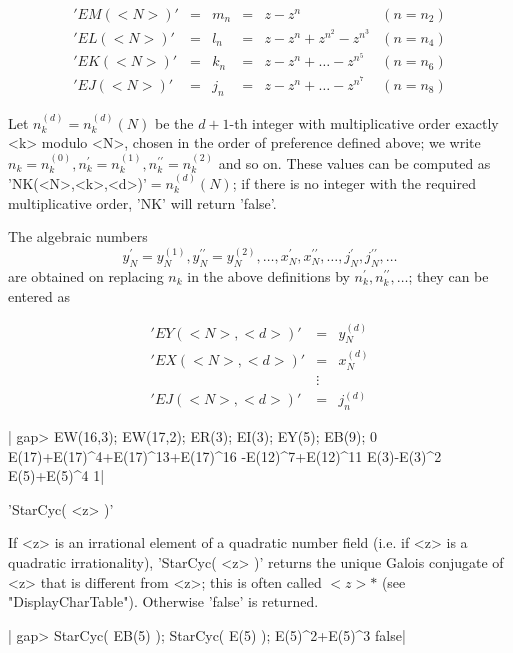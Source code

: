 \[\begin{array}{llllll}
'EM(<N>)' & = & m_n & = & z-z^n &(n=n_2)\\
'EL(<N>)' & = & l_n & = & z-z^n+z^{n^2}-z^{n^3} &(n=n_4)\\
'EK(<N>)' & = & k_n & = & z-z^n+\ldots -z^{n^5} &(n=n_6)\\
'EJ(<N>)' & = & j_n & = & z-z^n+\ldots -z^{n^7} &(n=n_8)
\end{array}\]

Let  $n_k^{(d)}  =  n_k^{(d)}(N)$  be   the   $d+1$-th  integer   with
multiplicative order exactly <k> modulo  <N>,  chosen  in the order of
preference          defined          above;          we          write
$n_k=n_k^{(0)},n_k^{\prime}=n_k^{(1)}, n_k^{\prime\prime} = n_k^{(2)}$
and  so  on.  These  values can be  computed  as 'NK(<N>,<k>,<d>)'$  =
n_k^{(d)}(N)$; if there is no integer with the required multiplicative
order, 'NK' will return 'false'.

The algebraic numbers
\[y_N^{\prime}=y_N^{(1)},y_N^{\prime\prime}=y_N^{(2)},\ldots,
x_N^{\prime},x_N^{\prime\prime},\ldots,
j_N^{\prime},j_N^{\prime\prime},\ldots\]
are obtained on replacing $n_k$ in the above
definitions by $n_k^{\prime},n_k^{\prime\prime},\ldots$; they
can be entered as

\[\begin{array}{lll}
'EY(<N>,<d>)' & = & y_N^{(d)}\\
'EX(<N>,<d>)' & = & x_N^{(d)}\\
 & \vdots \\
'EJ(<N>,<d>)' & = & j_n^{(d)}
\end{array}\]

|    gap> EW(16,3); EW(17,2); ER(3); EI(3); EY(5); EB(9);
    0
    E(17)+E(17)^4+E(17)^13+E(17)^16
    -E(12)^7+E(12)^11
    E(3)-E(3)^2
    E(5)+E(5)^4
    1|


'StarCyc( <z> )'

If <z> is an irrational  element of a  quadratic number field (i.e. if
<z> is a quadratic irrationality), 'StarCyc( <z> )' returns the unique
Galois  conjugate  of <z> that is different from  <z>;  this is  often
called  $<z>\ast$   (see  "DisplayCharTable").  Otherwise  'false'  is
returned.

|    gap> StarCyc( EB(5) ); StarCyc( E(5) );
    E(5)^2+E(5)^3
    false|


